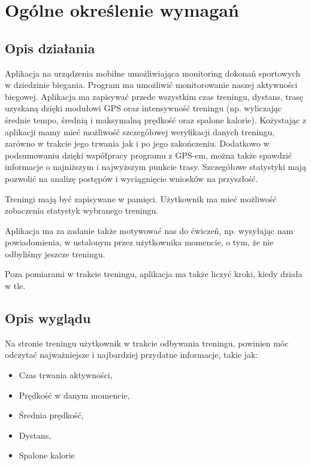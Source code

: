 	\newpage
\section{Ogólne określenie wymagań}		%




\subsection{Opis działania}  %

\hspace{0.60cm}Aplikacja na urządzenia mobilne umożliwiająca monitoring dokonań sportowych w dziedzinie biegania. Program ma umożliwić monitorowanie naszej aktywności biegowej. Aplikacja ma zapisywać przede wszystkim czas treningu, dystans, trasę uzyskaną dzięki modułowi GPS oraz intensywność treningu (np. wyliczając średnie tempo, średnią i maksymalną prędkość oraz spalone kalorie). Kożystając z aplikacji mamy mieć możliwość szczegółowej weryfikacji danych treningu, zarówno w trakcie jego trwania jak i po jego zakończeniu. Dodatkowo w podsumowaniu dzięki współpracy programu z GPS-em, można także spawdzić informacje o najniższym i najwyższym punkcie trasy. Szczegółowe statystyki mają pozwolić na analizę postępów i wyciągnięcie wniosków na przyszłość.

Treningi mają być zapisywane w pamięci. Użytkownik ma mieć możliwość zobaczenia statystyk wybranego treningu.

Aplikacja ma za zadanie także motywować nas do ćwiczeń, np. wysyłając nam powiadomienia, w ustalonym przez użytkownika momencie, o tym, że nie odbyliśmy jeszcze treningu.

Poza pomiarami w trakcie treningu, aplikacja ma także liczyć kroki, kiedy działa w tle.






\subsection{Opis wyglądu}  %


\hspace{0.60cm}Na stronie treningu użytkownik w trakcie odbywania treningu, powinien móc odczytać najważniejsze i najbardziej przydatne informacje, takie jak:
\begin{itemize}
	\item Czas trwania aktywności,
	\item Prędkość w danym momencie,
	\item Średnia prędkość,
	\item Dystans,
	\item Spalone kalorie
\end{itemize}


